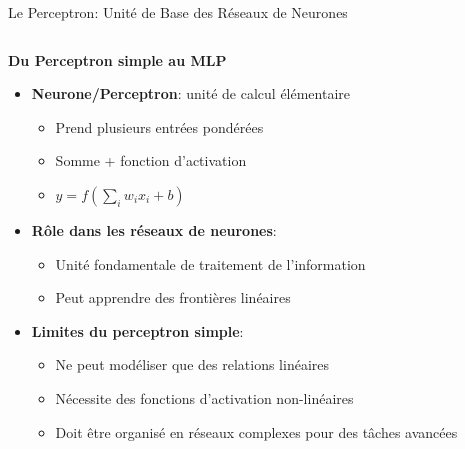 \documentclass[aspectratio=169,11pt]{beamer}
\begin{document}
\begin{frame}{Le Perceptron: Unité de Base des Réseaux de Neurones}
    \begin{columns}
        \begin{column}{0.55\textwidth}
            \textbf{Du Perceptron simple au MLP}
            \begin{itemize}
                \item \textbf{Neurone/Perceptron}: unité de calcul élémentaire
                \begin{itemize}
                    \item Prend plusieurs entrées pondérées
                    \item Somme + fonction d'activation
                    \item $y = f(\sum_i w_i x_i + b)$
                \end{itemize}
                \vspace{0.2cm}
                \item \textbf{Rôle dans les réseaux de neurones}:
                \begin{itemize}
                    \item Unité fondamentale de traitement de l'information
                    \item Peut apprendre des frontières linéaires
                \end{itemize}
                \vspace{0.2cm}
                \item \textbf{Limites du perceptron simple}:
                \begin{itemize}
                    \item Ne peut modéliser que des relations linéaires
                    \item Nécessite des fonctions d'activation non-linéaires
                    \item Doit être organisé en réseaux complexes pour des tâches avancées
                \end{itemize}
            \end{itemize}
        \end{column}
        \begin{column}{0.45\textwidth}
            \begin{center}
\end{center}
\end{column}
\end{columns}
\end{frame}
\end{document}
